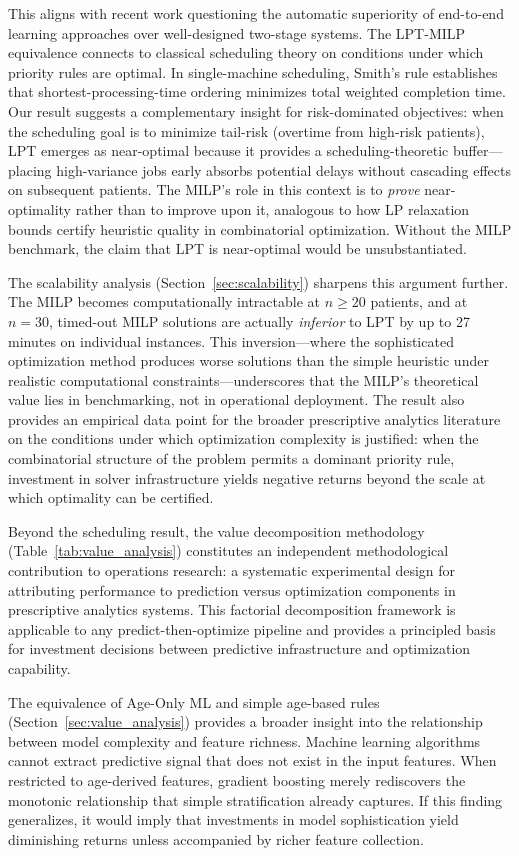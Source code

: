 \documentclass[11pt,a4paper]{article}
\begin{document}
This aligns with recent work questioning the automatic superiority of end-to-end learning approaches over well-designed two-stage systems. The LPT-MILP equivalence connects to classical scheduling theory on conditions under which priority rules are optimal. In single-machine scheduling, Smith's rule establishes that shortest-processing-time ordering minimizes total weighted completion time. Our result suggests a complementary insight for risk-dominated objectives: when the scheduling goal is to minimize tail-risk (overtime from high-risk patients), LPT emerges as near-optimal because it provides a scheduling-theoretic buffer---placing high-variance jobs early absorbs potential delays without cascading effects on subsequent patients. The MILP's role in this context is to \textit{prove} near-optimality rather than to improve upon it, analogous to how LP relaxation bounds certify heuristic quality in combinatorial optimization. Without the MILP benchmark, the claim that LPT is near-optimal would be unsubstantiated.

The scalability analysis (Section~\ref{sec:scalability}) sharpens this argument further. The MILP becomes computationally intractable at $n \geq 20$ patients, and at $n = 30$, timed-out MILP solutions are actually \textit{inferior} to LPT by up to 27 minutes on individual instances. This inversion---where the sophisticated optimization method produces worse solutions than the simple heuristic under realistic computational constraints---underscores that the MILP's theoretical value lies in benchmarking, not in operational deployment. The result also provides an empirical data point for the broader prescriptive analytics literature on the conditions under which optimization complexity is justified: when the combinatorial structure of the problem permits a dominant priority rule, investment in solver infrastructure yields negative returns beyond the scale at which optimality can be certified.

Beyond the scheduling result, the value decomposition methodology (Table~\ref{tab:value_analysis}) constitutes an independent methodological contribution to operations research: a systematic experimental design for attributing performance to prediction versus optimization components in prescriptive analytics systems. This factorial decomposition framework is applicable to any predict-then-optimize pipeline and provides a principled basis for investment decisions between predictive infrastructure and optimization capability.

The equivalence of Age-Only ML and simple age-based rules (Section~\ref{sec:value_analysis}) provides a broader insight into the relationship between model complexity and feature richness. Machine learning algorithms cannot extract predictive signal that does not exist in the input features. When restricted to age-derived features, gradient boosting merely rediscovers the monotonic relationship that simple stratification already captures. If this finding generalizes, it would imply that investments in model sophistication yield diminishing returns unless accompanied by richer feature collection.
\end{document}
